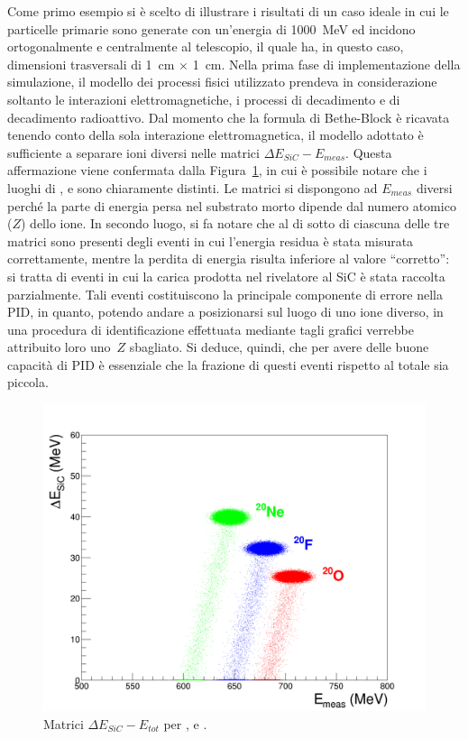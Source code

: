 Come primo esempio si è scelto di illustrare i risultati di un caso ideale in cui le particelle primarie sono generate con un'energia di 1000~MeV ed incidono ortogonalmente e centralmente al telescopio, il quale ha, in questo caso, dimensioni trasversali di 1~cm $\times$ 1~cm.
Nella prima fase di implementazione della simulazione, il modello dei processi fisici utilizzato prendeva in considerazione soltanto le interazioni elettromagnetiche, i processi di decadimento e di decadimento radioattivo.
Dal momento che la formula di Bethe-Block è ricavata tenendo conto della sola interazione elettromagnetica, il modello adottato è sufficiente a separare ioni diversi nelle matrici $\Delta E_{SiC} - E_{meas}$.
Questa affermazione viene confermata dalla Figura~\ref{fig:deltaE_ETot}, in cui è possibile notare che i luoghi di ,  e  sono chiaramente distinti.
Le matrici si dispongono ad $E_{meas}$ diversi perché la parte di energia persa nel substrato morto dipende dal numero atomico ($Z$) dello ione.
In secondo luogo, si fa notare che al di sotto di ciascuna delle tre matrici sono presenti degli eventi in cui l'energia residua è stata misurata correttamente, mentre la perdita di energia risulta inferiore al valore ``corretto'': si tratta di eventi in cui la carica prodotta nel rivelatore al SiC è stata raccolta parzialmente. 
Tali eventi costituiscono la principale componente di errore nella PID, in quanto, potendo andare a posizionarsi sul luogo di uno ione diverso, in una procedura di identificazione effettuata mediante tagli grafici verrebbe attribuito loro uno~$Z$ sbagliato.
Si deduce, quindi, che per avere delle buone capacità di PID è essenziale che la frazione di questi eventi rispetto al totale sia piccola.



\begin{figure} [!t]
	\centering
	\includegraphics[width=\textwidth, keepaspectratio]{Grafici_Tesi2/Particelle_monocromatiche/deltaE_ETot_quadrata.png}
	\caption{Matrici $\Delta E_{SiC} - E_{tot}$ per ,  e .} \label{fig:deltaE_ETot}
\end{figure}



